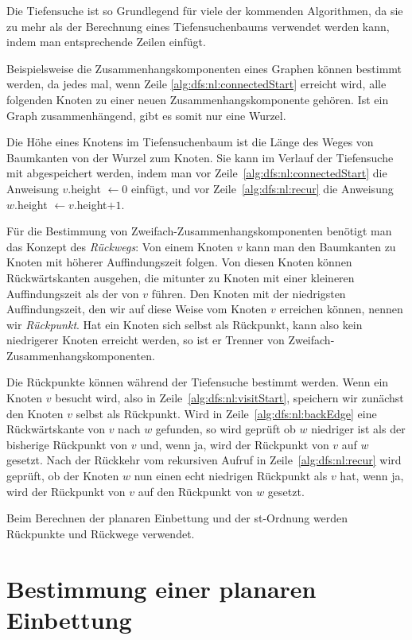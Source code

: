 \documentclass[a4paper]{scrreprt}
\theoremstyle{definition}
\begin{document}
Die Tiefensuche ist so Grundlegend für viele der kommenden Algorithmen, da sie zu mehr als der Berechnung eines Tiefensuchenbaums verwendet werden kann, indem man entsprechende Zeilen einfügt. 

Beispielsweise die Zusammenhangskomponenten eines Graphen können bestimmt werden, da jedes mal, wenn Zeile \ref{alg:dfs:nl:connectedStart} erreicht wird, alle folgenden Knoten zu einer neuen Zusammenhangskomponente gehören. Ist ein Graph zusammenhängend, gibt es somit nur eine Wurzel.

Die Höhe eines Knotens im Tiefensuchenbaum ist die Länge des Weges von Baumkanten von der Wurzel zum Knoten. Sie kann im Verlauf der Tiefensuche mit abgespeichert werden, indem man vor Zeile~\ref{alg:dfs:nl:connectedStart} die Anweisung $v.$height $\leftarrow 0$ einfügt, und vor Zeile~\ref{alg:dfs:nl:recur} die Anweisung $w.$height $\leftarrow v.$height$ + 1$.


Für die Bestimmung von Zweifach-Zusammenhangskomponenten benötigt man das Konzept des \emph{Rückwegs}: Von einem Knoten $v$ kann man den Baumkanten zu Knoten mit höherer Auffindungszeit folgen. Von diesen Knoten können Rückwärtskanten ausgehen, die mitunter zu Knoten mit einer kleineren Auffindungszeit als der von $v$ führen. Den Knoten mit der niedrigsten Auffindungszeit, den wir auf diese Weise vom Knoten $v$ erreichen können, nennen wir \emph{Rückpunkt}. Hat ein Knoten sich selbst als Rückpunkt, kann also kein niedrigerer Knoten erreicht werden, so ist er Trenner von Zweifach-Zusammenhangskomponenten.

Die Rückpunkte können während der Tiefensuche bestimmt werden. Wenn ein Knoten $v$ besucht wird, also in Zeile~\ref{alg:dfs:nl:visitStart}, speichern wir zunächst den Knoten $v$ selbst als Rückpunkt. Wird in Zeile~\ref{alg:dfs:nl:backEdge} eine Rückwärtskante von $v$ nach $w$ gefunden, so wird geprüft ob $w$ niedriger ist als der bisherige Rückpunkt von $v$ und, wenn ja, wird der Rückpunkt von $v$ auf $w$ gesetzt. Nach der Rückkehr vom rekursiven Aufruf in Zeile~\ref{alg:dfs:nl:recur} wird geprüft, ob der Knoten $w$ nun einen echt niedrigen Rückpunkt als $v$ hat, wenn ja, wird der Rückpunkt von $v$ auf den Rückpunkt von $w$ gesetzt.

Beim Berechnen der planaren Einbettung und der st-Ordnung werden Rückpunkte und Rückwege verwendet.

\section{Bestimmung einer planaren Einbettung}
\end{document}
